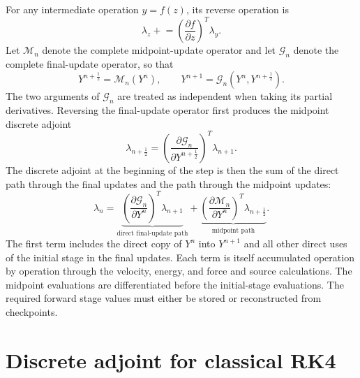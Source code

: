 \documentclass[11pt]{article}
\begin{document}
For any intermediate operation $y=f(z)$, its reverse operation is
\[
 \lambda_z\mathrel{+}=
 \left(\frac{\partial f}{\partial z}\right)^T\lambda_y.
\]
Let $\mathcal M_n$ denote the complete midpoint-update operator and let
$\mathcal G_n$ denote the complete final-update operator, so that
\[
 Y^{n+\frac12}=\mathcal M_n(Y^n),
 \qquad
 Y^{n+1}=\mathcal G_n(Y^n,Y^{n+\frac12}).
\]
The two arguments of $\mathcal G_n$ are treated as independent when taking
its partial derivatives.  Reversing the final-update operator first produces
the midpoint discrete adjoint
\[
 \lambda_{n+\frac12}=
 \left(\frac{\partial\mathcal G_n}{\partial Y^{n+\frac12}}\right)^T
 \lambda_{n+1}.
\]
The discrete adjoint at the beginning of the step is then the sum of the direct path
through the final updates and the path through the midpoint updates:
\[
 \boxed{
 \lambda_n=
 \underbrace{
 \left(\frac{\partial\mathcal G_n}{\partial Y^n}\right)^T
 \lambda_{n+1}}_{\text{direct final-update path}}
 +
 \underbrace{
 \left(\frac{\partial\mathcal M_n}{\partial Y^n}\right)^T
 \lambda_{n+\frac12}}_{\text{midpoint path}}.}
\]
The first term includes the direct copy of $Y^n$ into $Y^{n+1}$ and all
other direct uses of the initial stage in the final updates.  Each term is
itself accumulated operation by operation through the velocity, energy, and
force and source calculations.  The midpoint evaluations are differentiated
before the initial-stage evaluations.  The required forward stage values
must either be stored or reconstructed from checkpoints.

\section{Discrete adjoint for classical RK4}
\end{document}

